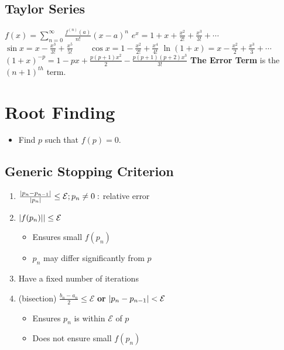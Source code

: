 \documentclass[8pt, letterpaper]{extarticle}
\newcommand{\bigEps}{\mathcal{E}}
\begin{document}
\begin{multicols*}{3}
  \subsection{Taylor Series}
  $\displaystyle f(x) = \sum_{n=0}^\infty \frac{f^{(n)}(a)}{n!}(x-a)^n$\newline
  $e^x = 1 + x + \frac{x^2}{2!} + \frac{x^3}{3!} + \dotsb$\newline
  $\sin x = x - \frac{x^3}{3!} + \frac{x^5}{5!}\qquad\cos x = 1 - \frac{x^2}{2!} +
  \frac{x^4}{4!}$\newline
  $\ln (1+x) = x - \frac{x^2}{2} + \frac{x^3}{3} + \dotsb$ \newline %
  $(1+x)^{-p} = 1-px+\frac{p(p+1)x^2}{2} -\frac{p(p+1)(p+2)x^3}{3!}$ %
  \textbf{The Error Term} is the $(n+1)^{th}$ term.

  \section{Root Finding}
  \begin{itemize}
  \item Find $p$ such that $f(p) = 0$.
  \end{itemize}

  \subsection{Generic Stopping Criterion}
  \begin{enumerate}
    \item $\frac{\abs{p_n-p_{n-1}}}{\abs{p_n}} \leq \bigEps; p_n \neq 0:$
      relative error
    \item $\abs{f(p_n)|} \leq \bigEps$
      \begin{itemize}
        \item Ensures small $f(p_n)$
        \item $p_n$ may differ significantly from $p$
      \end{itemize}
    \item Have a fixed number of iterations
    \item (bisection) 
      $\frac{b_n-a_n}{2} \leq \bigEps$ \textbf{or} $\abs{p_n-p_{n-1}} <\bigEps$
      \begin{itemize}
        \item Ensures $p_n$ is within $\bigEps$ of  $p$
        \item Does not ensure small $f(p_n)$
      \end{itemize}
  \end{enumerate}


\end{multicols*}
\end{document}
